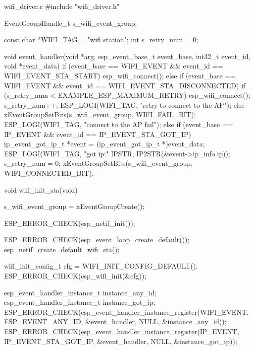 \documentclass[lang=cn,newtx,10pt,scheme=chinese]{elegantbook}
\begin{document}
\begin{mycode}{wifi\_driver.c}
#include "wifi_driver.h"

EventGroupHandle_t s_wifi_event_group;

const char *WIFI_TAG = "wifi station";
int s_retry_num = 0;

void event_handler(void *arg, esp_event_base_t event_base,
                          int32_t event_id, void *event_data)
{
    if (event_base == WIFI_EVENT && event_id == WIFI_EVENT_STA_START)
    {
        esp_wifi_connect();
    }
    else if (event_base == WIFI_EVENT && event_id == WIFI_EVENT_STA_DISCONNECTED)
    {
        if (s_retry_num < EXAMPLE_ESP_MAXIMUM_RETRY)
        {
            esp_wifi_connect();
            s_retry_num++;
            ESP_LOGI(WIFI_TAG, "retry to connect to the AP");
        }
        else
        {
            xEventGroupSetBits(s_wifi_event_group, WIFI_FAIL_BIT);
        }
        ESP_LOGI(WIFI_TAG, "connect to the AP fail");
    }
    else if (event_base == IP_EVENT && event_id == IP_EVENT_STA_GOT_IP)
    {
        ip_event_got_ip_t *event = (ip_event_got_ip_t *)event_data;
        ESP_LOGI(WIFI_TAG, "got ip:" IPSTR, IP2STR(&event->ip_info.ip));
        s_retry_num = 0;
        xEventGroupSetBits(s_wifi_event_group, WIFI_CONNECTED_BIT);
    }
}

void wifi_init_sta(void)
{
    s_wifi_event_group = xEventGroupCreate();

    ESP_ERROR_CHECK(esp_netif_init());

    ESP_ERROR_CHECK(esp_event_loop_create_default());
    esp_netif_create_default_wifi_sta();

    wifi_init_config_t cfg = WIFI_INIT_CONFIG_DEFAULT();
    ESP_ERROR_CHECK(esp_wifi_init(&cfg));

    esp_event_handler_instance_t instance_any_id;
    esp_event_handler_instance_t instance_got_ip;
    ESP_ERROR_CHECK(esp_event_handler_instance_register(WIFI_EVENT,
                                                        ESP_EVENT_ANY_ID,
                                                        &event_handler,
                                                        NULL,
                                                        &instance_any_id));
    ESP_ERROR_CHECK(esp_event_handler_instance_register(IP_EVENT,
                                                        IP_EVENT_STA_GOT_IP,
                                                        &event_handler,
                                                        NULL,
                                                        &instance_got_ip));

}
\end{mycode}
\end{document}
